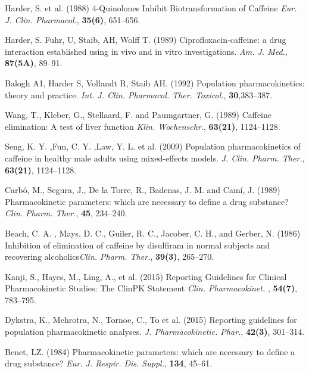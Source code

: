 \documentclass[a4,center,fleqn]{NAR}
\begin{document}
\begin{thebibliography}{4}
Harder, S. et al. (1988)
4-Quinolones Inhibit Biotransformation of Caffeine
\textit{Eur. J. Clin. Pharmacol.}, \textbf{35(6)}, 651--656.


Harder, S. Fuhr, U, Staib, AH, Wolff T. (1989)
Ciprofloxacin-caffeine: a drug interaction established using in vivo and in vitro investigations.
\textit{Am. J. Med.}, \textbf{87(5A)}, 89--91.


Balogh A1, Harder S, Vollandt R, Staib AH.  (1992)
Population pharmacokinetics: theory and practice.
\textit{Int. J. Clin. Pharmacol. Ther. Toxicol.}, \textbf{30},383--387.


Wang, T., Kleber, G., Stellaard, F. and Paumgartner, G.  (1989)
Caffeine elimination: A test of liver function
\textit{Klin. Wochenschr.}, \textbf{63(21)}, 1124--1128.

Seng, K. Y. ,Fun, C. Y. ,Law, Y. L. et al.  (2009)
Population pharmacokinetics of caffeine in healthy male adults using mixed-effects models. 
\textit{J. Clin. Pharm. Ther.}, \textbf{63(21)}, 1124--1128.

Carbó, M., Segura, J., De la Torre, R., Badenas, J. M. and Camí, J.  (1989)
Pharmacokinetic parameters: which are necessary to define a drug substance?
\textit{Clin. Pharm. Ther.}, \textbf{45}, 234--240.

Beach, C. A. , Mays, D. C., Guiler, R. C., Jacober, C. H., and Gerber, N. (1986)
Inhibition of elimination of caffeine by disulfiram in normal subjects and recovering alcoholics\textit{Clin. Pharm. Ther.}, \textbf{39(3)}, 265--270.

Kanji, S., Hayes, M., Ling, A., et al. (2015)
Reporting Guidelines for Clinical Pharmacokinetic Studies: The ClinPK Statement 
\textit{Clin. Pharmacokinet. }, \textbf{54(7)}, 783--795.

Dykstra, K., Mehrotra, N., Tornoe, C., To   et al.  (2015)
Reporting guidelines for population pharmacokinetic analyses. 
\textit{J. Pharmacokinetic. Phar.}, \textbf{42(3)}, 301--314.


Benet, LZ.  (1984)
Pharmacokinetic parameters: which are necessary to define a drug substance?
\textit{ Eur. J. Respir. Dis. Suppl.}, \textbf{134}, 45--61.


\end{thebibliography}
\end{document}

